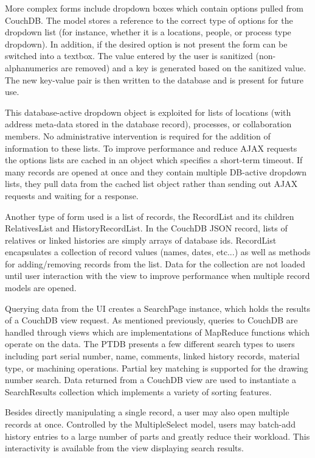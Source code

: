 \documentclass[journal]{IEEEtran}
\begin{document}
More complex forms include dropdown boxes which contain options pulled from CouchDB. The model
stores a reference to the correct type of options for the dropdown list (for instance, whether it is a locations, people,
or process type dropdown). In addition, if the 
desired option is not present the form can be switched into a textbox. The value entered by
the user is sanitized (non-alphanumerics are removed) and a key is generated based on the sanitized value. The new key-value
pair is then written to the database and is present for future use.

This database-active dropdown object is exploited for lists of locations (with address meta-data
stored in the database record), processes, or collaboration members. No administrative intervention
is required for the addition of information to these lists. To improve performance and reduce
AJAX requests the options lists are cached in an object which specifies a short-term timeout.
If many records are opened at once and they contain multiple DB-active dropdown lists, they 
pull data from the cached list object rather than sending out AJAX requests and waiting for 
a response.

Another type of form used is a list of records, the RecordList and its children RelativesList and HistoryRecordList. 
In the CouchDB JSON record, lists of relatives or linked histories are simply arrays of database ids.
RecordList encapsulates a collection of record values (names, dates, etc...)
as well as methods for adding/removing records from the list. Data for the collection are not loaded
until user interaction with the view to improve performance when multiple record models are opened.

Querying data from the UI creates a SearchPage instance, which holds the results of a CouchDB view request.
As mentioned previously, queries to CouchDB are handled through views which are implementations of
MapReduce functions which operate on the data. The PTDB presents a few different search types to users including
part serial number, name, comments, linked history records, material type, or machining operations.
Partial key matching is supported for the drawing number search.
Data returned from a CouchDB view are used to instantiate a SearchResults collection which implements a variety of
sorting features. 

Besides directly manipulating a single record, a user may also open multiple records at once.
Controlled by the MultipleSelect model, users may batch-add history entries to a
large number of parts and greatly reduce their workload. This interactivity is available from
the view displaying search results.
\end{document}
